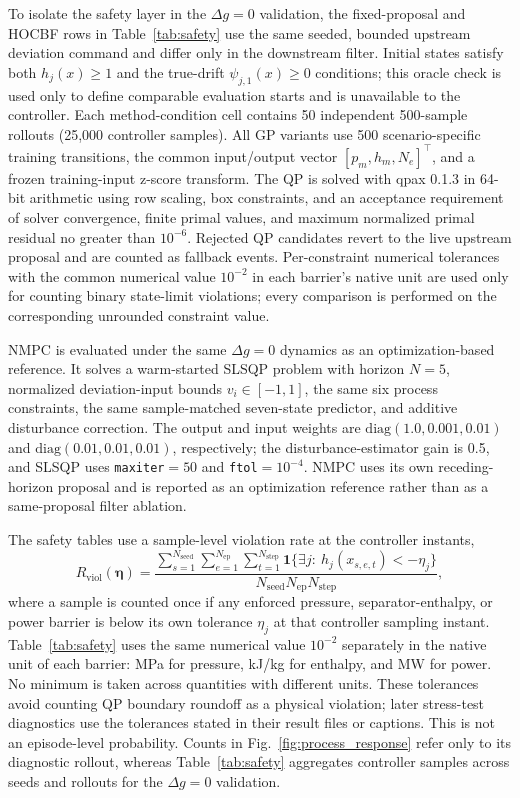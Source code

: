 To isolate the safety layer in the $\Delta g=0$ validation, the fixed-proposal and HOCBF rows in Table~\ref{tab:safety} use the same seeded, bounded upstream deviation command and differ only in the downstream filter. Initial states satisfy both $h_j(x)\geq1$ and the true-drift $\psi_{j,1}(x)\geq0$ conditions; this oracle check is used only to define comparable evaluation starts and is unavailable to the controller. Each method-condition cell contains 50 independent 500-sample rollouts (25,000 controller samples). All GP variants use 500 scenario-specific training transitions, the common input/output vector $[p_m,h_m,N_e]^\top$, and a frozen training-input z-score transform. The QP is solved with qpax 0.1.3 in 64-bit arithmetic using row scaling, box constraints, and an acceptance requirement of solver convergence, finite primal values, and maximum normalized primal residual no greater than $10^{-6}$. Rejected QP candidates revert to the live upstream proposal and are counted as fallback events. Per-constraint numerical tolerances with the common numerical value $10^{-2}$ in each barrier's native unit are used only for counting binary state-limit violations; every comparison is performed on the corresponding unrounded constraint value.

NMPC is evaluated under the same $\Delta g=0$ dynamics as an optimization-based reference. It solves a warm-started SLSQP problem with horizon $N{=}5$, normalized deviation-input bounds $v_i\in[-1,1]$, the same six process constraints, the same sample-matched seven-state predictor, and additive disturbance correction. The output and input weights are $\mathrm{diag}(1.0,0.001,0.01)$ and $\mathrm{diag}(0.01,0.01,0.01)$, respectively; the disturbance-estimator gain is 0.5, and SLSQP uses \texttt{maxiter}$=50$ and \texttt{ftol}$=10^{-4}$. NMPC uses its own receding-horizon proposal and is reported as an optimization reference rather than as a same-proposal filter ablation.

The safety tables use a sample-level violation rate at the controller instants,
\begin{equation}
    R_{\mathrm{viol}}(\boldsymbol{\eta}) =
    \frac{\sum_{s=1}^{N_{\mathrm{seed}}}\sum_{e=1}^{N_{\mathrm{ep}}}\sum_{t=1}^{N_{\mathrm{step}}}
    \mathbf{1}\{\exists j:\ h_j(x_{s,e,t}) < -\eta_j\}}
    {N_{\mathrm{seed}}N_{\mathrm{ep}}N_{\mathrm{step}}},
\label{eq:sample_violation_rate}
\end{equation}
where a sample is counted once if any enforced pressure, separator-enthalpy, or power barrier is below its own tolerance $\eta_j$ at that controller sampling instant. Table~\ref{tab:safety} uses the same numerical value $10^{-2}$ separately in the native unit of each barrier: MPa for pressure, kJ/kg for enthalpy, and MW for power. No minimum is taken across quantities with different units. These tolerances avoid counting QP boundary roundoff as a physical violation; later stress-test diagnostics use the tolerances stated in their result files or captions. This is not an episode-level probability. Counts in Fig.~\ref{fig:process_response} refer only to its diagnostic rollout, whereas Table~\ref{tab:safety} aggregates controller samples across seeds and rollouts for the $\Delta g=0$ validation.

